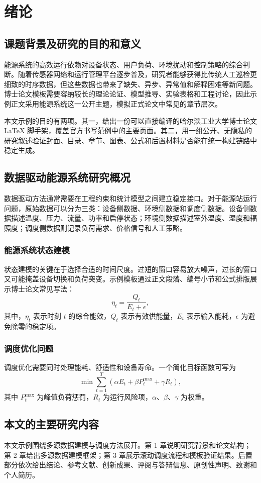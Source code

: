 \chapter{绪\quad 论}

\section{课题背景及研究的目的和意义}

能源系统的高效运行依赖对设备状态、用户负荷、环境扰动和控制策略的综合判断。随着传感器网络和运行管理平台逐步普及，研究者能够获得比传统人工巡检更细致的时序数据，但这些数据也带来了缺失、异步、异常值和解释困难等新问题。博士论文模板需要容纳较长的理论论证、模型推导、实验表格和工程讨论，因此示例正文采用能源系统这一公开主题，模拟正式论文中常见的章节层次。

本文示例的目的有两项。其一，给出一份可以直接编译的哈尔滨工业大学博士论文 LaTeX 脚手架，覆盖官方书写范例中的主要页面。其二，用一组公开、无隐私的研究叙述验证封面、目录、章节、图表、公式和后置材料是否能在统一构建链路中稳定生成。

\section{数据驱动能源系统研究概况}

数据驱动方法通常需要在工程约束和统计模型之间建立稳定接口。对于能源站运行问题，原始数据可以分为三类：设备侧数据、环境侧数据和调度侧数据。设备侧数据描述温度、压力、流量、功率和启停状态；环境侧数据描述室外温度、湿度和辐照度；调度侧数据则记录负荷需求、价格信号和人工策略。

\subsection{能源系统状态建模}

状态建模的关键在于选择合适的时间尺度。过短的窗口容易放大噪声，过长的窗口又可能掩盖设备切换和负荷突变。示例模板通过正文段落、编号小节和公式排版展示博士论文常见写法：
\begin{equation}
  \eta_t = \frac{Q_t}{E_t + \epsilon},
\end{equation}
其中，$\eta_t$ 表示时刻 $t$ 的综合能效，$Q_t$ 表示有效供能量，$E_t$ 表示输入能耗，$\epsilon$ 为避免除零的稳定项。

\subsection{调度优化问题}

调度优化需要同时处理能耗、舒适性和设备寿命。一个简化目标函数可写为
\begin{equation}
  \min \sum_{t=1}^{T}\left(\alpha E_t + \beta P_t^{\max} + \gamma R_t\right),
\end{equation}
其中 $P_t^{\max}$ 为峰值负荷惩罚，$R_t$ 为运行风险项，$\alpha$、$\beta$、$\gamma$ 为权重。

\section{本文的主要研究内容}

本文示例围绕多源数据建模与调度方法展开。第 1 章说明研究背景和论文结构；第 2 章给出多源数据建模框架；第 3 章展示滚动调度流程和模板验证结果。后置部分依次给出结论、参考文献、创新成果、评阅与答辩信息、原创性声明、致谢和个人简历。
